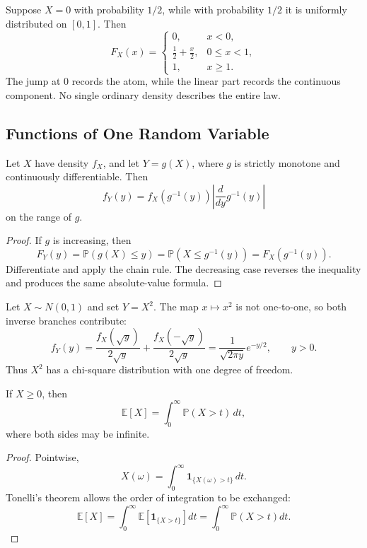 \begin{example}
Suppose $X=0$ with probability $1/2$, while with probability $1/2$ it is uniformly distributed on $[0,1]$. Then
\[
F_X(x)=
\begin{cases}
0,&x<0,\\
\frac12+\frac{x}{2},&0\leq x<1,\\
1,&x\geq1.
\end{cases}
\]
The jump at $0$ records the atom, while the linear part records the continuous component. No single ordinary density describes the entire law.
\end{example}

\subsection{Functions of One Random Variable}

\begin{theorem}
Let $X$ have density $f_X$, and let $Y=g(X)$, where $g$ is strictly monotone and continuously differentiable. Then
\[
    f_Y(y)=f_X(g^{-1}(y))
    \left|\frac{d}{dy}g^{-1}(y)\right|
\]
on the range of $g$.
\end{theorem}

\begin{proof}
If $g$ is increasing, then
\[
    F_Y(y)=\mathbb{P}(g(X)\leq y)
    =\mathbb{P}(X\leq g^{-1}(y))
    =F_X(g^{-1}(y)).
\]
Differentiate and apply the chain rule. The decreasing case reverses the inequality and produces the same absolute-value formula.
\end{proof}

\begin{example}
Let $X\sim N(0,1)$ and set $Y=X^2$. The map $x\mapsto x^2$ is not one-to-one, so both inverse branches contribute:
\[
    f_Y(y)
    =\frac{f_X(\sqrt y)}{2\sqrt y}
     +\frac{f_X(-\sqrt y)}{2\sqrt y}
    =\frac{1}{\sqrt{2\pi y}}e^{-y/2},
    \qquad y>0.
\]
Thus $X^2$ has a chi-square distribution with one degree of freedom.
\end{example}

\begin{theorem}
If $X\geq0$, then
\[
    \mathbb{E}[X]=\int_0^\infty\mathbb{P}(X>t)\,dt,
\]
where both sides may be infinite.
\end{theorem}

\begin{proof}
Pointwise,
\[
    X(\omega)=\int_0^\infty
    \mathbf{1}_{\{X(\omega)>t\}}\,dt.
\]
Tonelli's theorem allows the order of integration to be exchanged:
\[
    \mathbb{E}[X]
    =\int_0^\infty
    \mathbb{E}[\mathbf{1}_{\{X>t\}}]dt
    =\int_0^\infty\mathbb{P}(X>t)dt.
\]
\end{proof}

